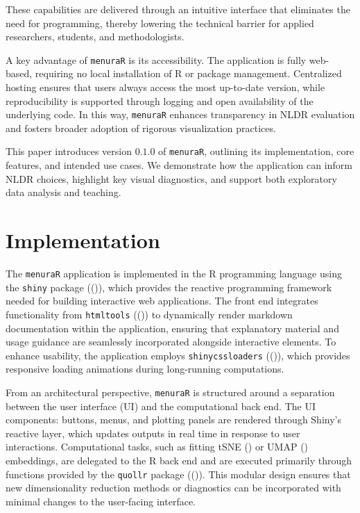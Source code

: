 \documentclass[
  11pt,
  a4paper,
]{report}
\begin{document}
These capabilities are delivered through an intuitive interface that
eliminates the need for programming, thereby lowering the technical
barrier for applied researchers, students, and methodologists.

A key advantage of \texttt{menuraR} is its accessibility. The
application is fully web-based, requiring no local installation of R or
package management. Centralized hosting ensures that users always access
the most up-to-date version, while reproducibility is supported through
logging and open availability of the underlying code. In this way,
\texttt{menuraR} enhances transparency in NLDR evaluation and fosters
broader adoption of rigorous visualization practices.

This paper introduces version \(0.1.0\) of \texttt{menuraR}, outlining
its implementation, core features, and intended use cases. We
demonstrate how the application can inform NLDR choices, highlight key
visual diagnostics, and support both exploratory data analysis and
teaching.

\section{Implementation}\label{implementation-2}

The \texttt{menuraR} application is implemented in the R programming
language using the \texttt{shiny} package
(()), which provides
the reactive programming framework needed for building interactive web
applications. The front end integrates functionality from
\texttt{htmltools} (()) to
dynamically render markdown documentation within the application,
ensuring that explanatory material and usage guidance are seamlessly
incorporated alongside interactive elements. To enhance usability, the
application employs \texttt{shinycssloaders}
(()), which provides
responsive loading animations during long-running computations.

From an architectural perspective, \texttt{menuraR} is structured around
a separation between the user interface (UI) and the computational back
end. The UI components: buttons, menus, and plotting panels are rendered
through Shiny's reactive layer, which updates outputs in real time in
response to user interactions. Computational tasks, such as fitting tSNE
() or UMAP
() embeddings, are
delegated to the R back end and are executed primarily through functions
provided by the \texttt{quollr} package
(()). This modular design
ensures that new dimensionality reduction methods or diagnostics can be
incorporated with minimal changes to the user-facing interface.
\end{document}
